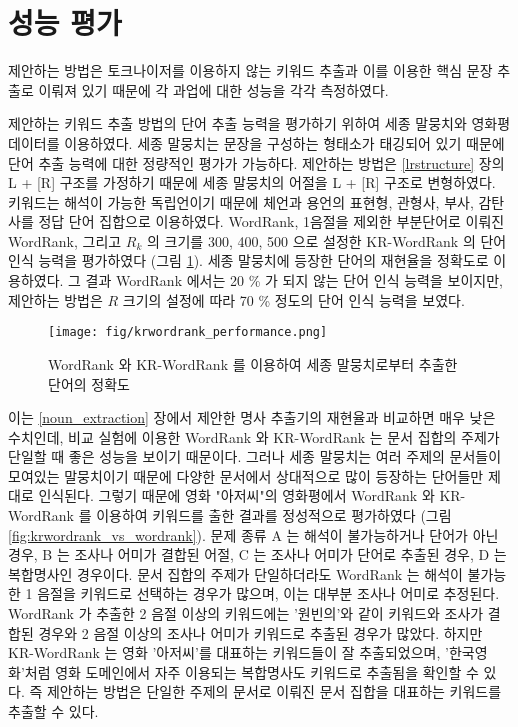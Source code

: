 \documentclass[oneside, ko,phd]{snuthesis_utf8_kor}
\begin{document}
\section{성능 평가}

제안하는 방법은 토크나이저를 이용하지 않는 키워드 추출과 이를 이용한 핵심 문장 추출로 이뤄져 있기 때문에 각 과업에 대한 성능을 각각 측정하였다.

제안하는 키워드 추출 방법의 단어 추출 능력을 평가하기 위하여 세종 말뭉치와 영화평 데이터를 이용하였다.
세종 말뭉치는 문장을 구성하는 형태소가 태깅되어 있기 때문에 단어 추출 능력에 대한 정량적인 평가가 가능하다.
제안하는 방법은 \ref{lrstructure} 장의 L + [R] 구조를 가정하기 때문에 세종 말뭉치의 어절을 L + [R] 구조로 변형하였다.
키워드는 해석이 가능한 독립언이기 때문에 체언과 용언의 표현형, 관형사, 부사, 감탄사를 정답 단어 집합으로 이용하였다.
WordRank, 1음절을 제외한 부분단어로 이뤄진 WordRank, 그리고 $R_k$ 의 크기를 300, 400, 500 으로 설정한 KR-WordRank 의 단어 인식 능력을 평가하였다 (그림 \ref{fig:krwordrank_performance}).
세종 말뭉치에 등장한 단어의 재현율을 정확도로 이용하였다.
그 결과 WordRank 에서는 20 \% 가 되지 않는 단어 인식 능력을 보이지만, 제안하는 방법은 $R$ 크기의 설정에 따라 70 \% 정도의 단어 인식 능력을 보였다.

\begin{figure}[H]
\centering
\texttt{[image: fig/krwordrank\_performance.png]}
\caption{WordRank 와 KR-WordRank 를 이용하여 세종 말뭉치로부터 추출한 단어의 정확도}
\label{fig:krwordrank_performance}
\end{figure}

이는 \ref{noun_extraction} 장에서 제안한 명사 추출기의 재현율과 비교하면 매우 낮은 수치인데, 비교 실험에 이용한 WordRank 와 KR-WordRank 는 문서 집합의 주제가 단일할 때 좋은 성능을 보이기 때문이다.
그러나 세종 말뭉치는 여러 주제의 문서들이 모여있는 말뭉치이기 때문에 다양한 문서에서 상대적으로 많이 등장하는 단어들만 제대로 인식된다.
그렇기 때문에 영화 "아저씨"의 영화평에서 WordRank 와 KR-WordRank 를 이용하여 키워드를 출한 결과를 정성적으로 평가하였다 (그림 \ref{fig:krwordrank_vs_wordrank}).
문제 종류 A 는 해석이 불가능하거나 단어가 아닌 경우, B 는 조사나 어미가 결합된 어절, C 는 조사나 어미가 단어로 추출된 경우, D 는 복합명사인 경우이다.
문서 집합의 주제가 단일하더라도 WordRank 는 해석이 불가능한 1 음절을 키워드로 선택하는 경우가 많으며, 이는 대부분 조사나 어미로 추정된다.
WordRank 가 추출한 2 음절 이상의 키워드에는 '원빈의'와 같이 키워드와 조사가 결합된 경우와 2 음절 이상의 조사나 어미가 키워드로 추출된 경우가 많았다.
하지만 KR-WordRank 는 영화 '아저씨'를 대표하는 키워드들이 잘 추출되었으며, '한국영화'처럼 영화 도메인에서 자주 이용되는 복합명사도 키워드로 추출됨을 확인할 수 있다.
즉 제안하는 방법은 단일한 주제의 문서로 이뤄진 문서 집합을 대표하는 키워드를 추출할 수 있다.
\end{document}
